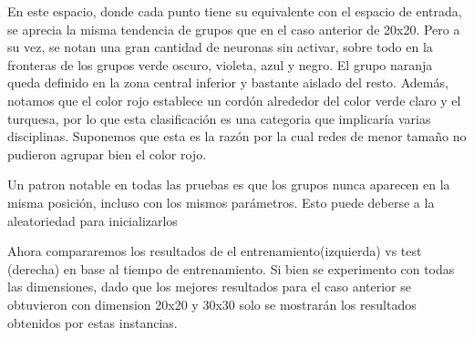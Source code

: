 En este espacio, donde cada punto tiene su equivalente con el espacio de entrada, se aprecia la misma tendencia de grupos que en el caso anterior de 20x20. Pero a su vez, se notan una gran cantidad de neuronas sin activar, sobre todo en la fronteras de los grupos verde oscuro, violeta, azul y negro. El grupo naranja queda definido en la zona central inferior y bastante aislado del resto. Adem\'as, notamos que el color rojo establece un cord\'on alrededor del color verde claro y el turquesa, por lo que esta clasificaci\'on es una categoria que implicar\'ia varias disciplinas. Suponemos que esta es la raz\'on por la cual redes de menor tama\~no no pudieron agrupar bien el color rojo.

Un patron notable en todas las pruebas es que los grupos nunca aparecen en la misma posici\'on, incluso con los mismos par\'ametros. Esto puede deberse a la aleatoriedad para inicializarlos

Ahora compararemos los resultados de el entrenamiento(izquierda) vs test (derecha) en base al tiempo de entrenamiento. Si bien se experimento con todas las dimensiones, dado que los mejores resultados para el caso anterior se obtuvieron con dimension 20x20 y 30x30 solo se mostrar\'an los resultados obtenidos por estas instancias.


